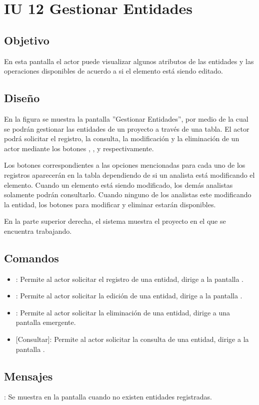 \section{IU 12 Gestionar Entidades}

\subsection{Objetivo}
	En esta pantalla el actor puede visualizar algunos atributos de las entidades y las operaciones disponibles de acuerdo a si el elemento está siendo editado.
\subsection{Diseño}
	En la figura  se muestra la pantalla ''Gestionar Entidades'', por medio de la cual se podrán gestionar las entidades de un proyecto a través de una tabla. El actor podrá solicitar el registro, la consulta, la modificación y la eliminación de un actor mediante los botones , , \editar y \eliminar respectivamente.
	
	Los botones correspondientes a las opciones mencionadas para cada uno de los registros aparecerán en la tabla dependiendo de si un analista está modificando el elemento. Cuando un elemento está siendo modificado, los demás analistas solamente podrán consultarlo. Cuando ninguno de los analistas este modificando la entidad, los botones para modificar y eliminar estarán disponibles.
	
	En la parte superior derecha, el sistema muestra el proyecto en el que se encuentra trabajando.

\subsection{Comandos}
\begin{itemize}
	\item {}: Permite al actor solicitar el registro de una entidad, dirige a la pantalla .
	\item \editar [Modificar]: Permite al actor solicitar la edición de una entidad, dirige a la pantalla .
	\item \eliminar [Eliminar]: Permite al actor solicitar la eliminación de una entidad, dirige a una pantalla emergente.
	\item {} [Consultar]: Permite al actor solicitar la consulta de una entidad, dirige a la pantalla  .
\end{itemize}
\subsection{Mensajes}

\begin{Citemize}
	\item {}: Se muestra en la pantalla  cuando no existen entidades registradas.
\end{Citemize}
